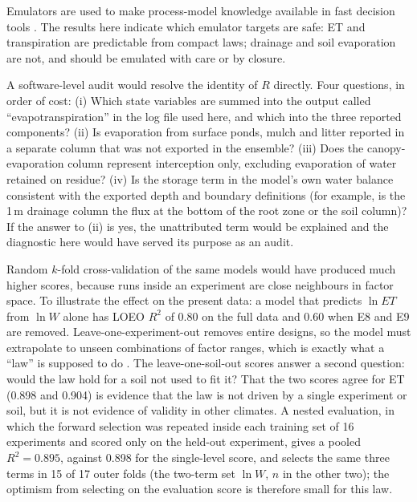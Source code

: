 \documentclass[preprint,12pt,authoryear]{elsarticle}
\begin{document}
Emulators are used to make process-model knowledge available in fast decision tools \citep{Razavi2012,Asher2015}. The results here indicate which emulator targets are safe: ET and transpiration are predictable from compact laws; drainage and soil evaporation are not, and should be emulated with care or by closure.

A software-level audit would resolve the identity of $R$ directly. Four questions, in order of cost: (i) Which state variables are summed into the output called ``evapotranspiration'' in the log file used here, and which into the three reported components? (ii) Is evaporation from surface ponds, mulch and litter reported in a separate column that was not exported in the ensemble? (iii) Does the canopy-evaporation column represent interception only, excluding evaporation of water retained on residue? (iv) Is the storage term in the model's own water balance consistent with the exported depth and boundary definitions (for example, is the 1\,m drainage column the flux at the bottom of the root zone or the soil column)? If the answer to (ii) is yes, the unattributed term would be explained and the diagnostic here would have served its purpose as an audit.

Random $k$-fold cross-validation of the same models would have produced much higher scores, because runs inside an experiment are close neighbours in factor space. To illustrate the effect on the present data: a model that predicts $\ln\mathit{ET}$ from $\ln W$ alone has LOEO $R^2$ of 0.80 on the full data and 0.60 when E8 and E9 are removed. Leave-one-experiment-out removes entire designs, so the model must extrapolate to unseen combinations of factor ranges, which is exactly what a ``law'' is supposed to do \citep{Roberts2017}. The leave-one-soil-out scores answer a second question: would the law hold for a soil not used to fit it? That the two scores agree for ET (0.898 and 0.904) is evidence that the law is not driven by a single experiment or soil, but it is not evidence of validity in other climates. A nested evaluation, in which the forward selection was repeated inside each training set of 16 experiments and scored only on the held-out experiment, gives a pooled $R^2=0.895$, against 0.898 for the single-level score, and selects the same three terms in 15 of 17 outer folds (the two-term set $\ln W$, $n$ in the other two); the optimism from selecting on the evaluation score is therefore small for this law.
\end{document}
